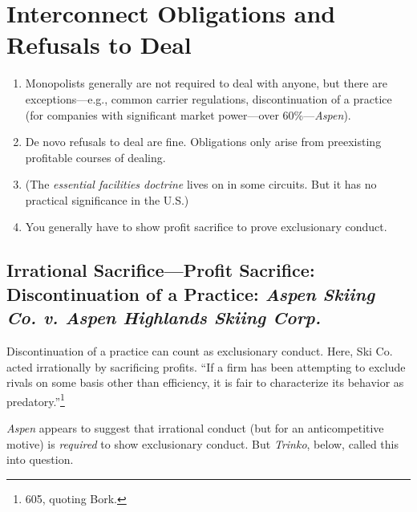 \section{Interconnect Obligations and Refusals to Deal}

\begin{enumerate}
    \item Monopolists generally are not required to deal with anyone, but there 
    are exceptions---e.g., common carrier regulations, discontinuation of a 
    practice (for companies with significant market power---over 
    60\%---\emph{Aspen}).
    \item De novo refusals to deal are fine. Obligations only arise from 
    preexisting profitable courses of dealing.
    \item (The \emph{essential facilities doctrine} lives on in some circuits. 
    But it has no practical significance in the U.S.)
    \item You generally have to show profit sacrifice to prove exclusionary 
    conduct.
\end{enumerate}

\subsection{Irrational Sacrifice---Profit Sacrifice: Discontinuation of a 
Practice: \emph{Aspen Skiing Co. v. Aspen Highlands Skiing Corp.}}

Discontinuation of a practice can count as exclusionary conduct. Here, Ski Co.  
acted irrationally by sacrificing profits. ``If a firm has been attempting to 
exclude rivals on some basis other than efficiency, it is fair to characterize 
its behavior as predatory.''\footnote{605, quoting Bork.}

\emph{Aspen} appears to suggest that irrational conduct (but for an 
anticompetitive motive) is \emph{required} to show exclusionary conduct. But 
\emph{Trinko}, below, called this into question.

